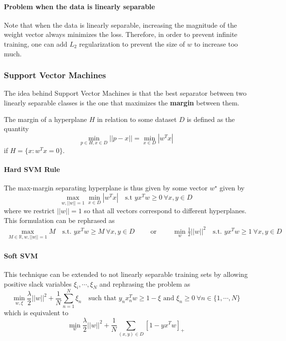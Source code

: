\documentclass{article}
\newcommand{\R}{\mathbb{R}}
\begin{document}
\paragraph{Problem when the data is linearly separable}

Note that when the data is linearly separable, increasing the magnitude of the weight vector always minimizes the loss.
Therefore, in order to prevent infinite training, one can add $L_2$ regularization to prevent the size of $w$ to increase too much.

\subsubsection{Support Vector Machines}

The idea behind Support Vector Machines is that the best separator between two linearly separable classes is the one that maximizes the \textbf{margin} between them.

The margin of a hyperplane $H$ in relation to some dataset $D$ is defined as the quantity
$$
\min_{p \in H, x \in D} ||p-x|| = \min_{x \in D} |w^T x|
$$
if $H = \{ x : w^T x = 0 \}$.

\paragraph{Hard SVM Rule}

The max-margin separating hyperplane is thus given by some vector $w^\star$ given by
$$
\max_{w, ||w||=1} \min_{x \in D} |w^T x| \quad \text{s.t } y x^T w \geq 0 \ \forall x, y \in D
$$
where we restrict $||w||=1$ so that all vectors correspond to different hyperplanes.
This formulation can be rephrased as
\begin{gather*}
\max_{M \in \R, w, ||w||=1} M \quad \text{s.t. } y x^T w \geq M \ \forall x, y \in D 
\quad \quad \text{ or } \quad \quad
\min_w \frac{1}{2}||w||^2 \quad \text{s.t. } y x^T w \geq 1 \ \forall x, y \in D
\end{gather*}

\paragraph{Soft SVM}

This technique can be extended to not linearly separable training sets by allowing positive slack variables $\xi_i, \cdots, \xi_N$ and rephrasing the problem as
$$
\min_{w, \xi} \frac{\lambda}{2} ||w||^2 + \frac{1}{N} \sum_{n=1}^N \xi_n
\quad \text{such that } y_n x_n^T w \geq 1 - \xi \text{ and } \xi_n \geq 0 \ \forall n \in \{1, \cdots, N\}
$$
which is equivalent to
$$
\min_w \frac{\lambda}{2} ||w||^2 + \frac{1}{N} \sum_{(x,y) \in D} [1 - y x^T w]_+
$$
\end{document}
